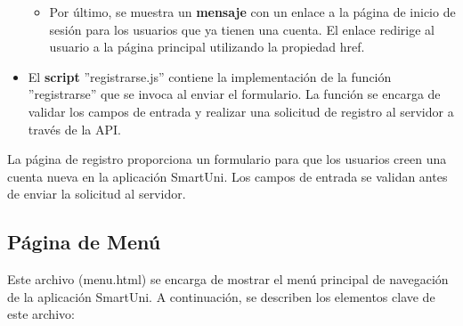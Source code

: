 \documentclass[12pt]{report}
\begin{document}
\begin{itemize}
\begin{itemize}
        \item Por último, se muestra un \textbf{mensaje} con un enlace a la página de inicio de sesión para los usuarios que ya tienen una cuenta. El enlace redirige al usuario a la página principal utilizando la propiedad href.
    \end{itemize}

    \item El\textbf{ script }''registrarse.js'' contiene la implementación de la función ''registrarse'' que se invoca al enviar el formulario. La función se encarga de validar los campos de entrada y realizar una solicitud de registro al servidor a través de la API.
\end{itemize}
La página de registro proporciona un formulario para que los usuarios creen una cuenta nueva en la aplicación SmartUni. Los campos de entrada se validan antes de enviar la solicitud al servidor.

\subsection{Página de Menú}
Este archivo (menu.html) se encarga de mostrar el menú principal de navegación de la aplicación SmartUni. A continuación, se describen los elementos clave de este archivo:
\end{document}
